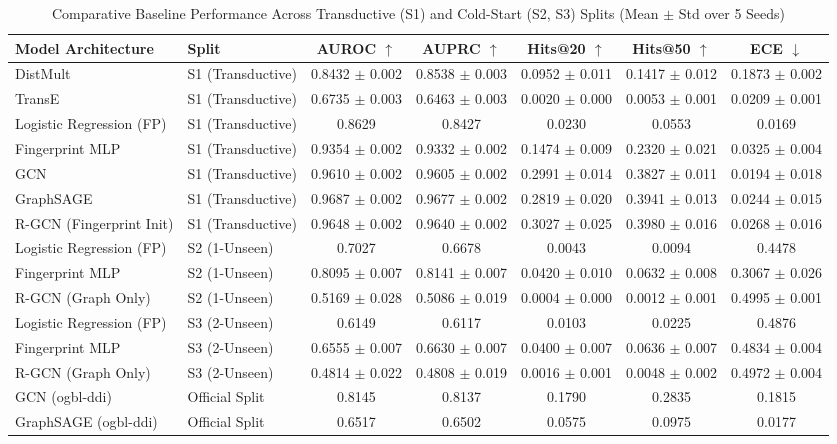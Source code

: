 \begin{table}[t]
\centering
\caption{Comparative Baseline Performance Across Transductive (S1) and Cold-Start (S2, S3) Splits (Mean $\pm$ Std over 5 Seeds)}
\label{tab:baselines}
\begin{tabular}{llccccc}
\toprule
\textbf{Model Architecture} & \textbf{Split} & \textbf{AUROC} $\uparrow$ & \textbf{AUPRC} $\uparrow$ & \textbf{Hits@20} $\uparrow$ & \textbf{Hits@50} $\uparrow$ & \textbf{ECE} $\downarrow$ \\
\midrule
DistMult & S1 (Transductive) & 0.8432 $\pm$ 0.002 & 0.8538 $\pm$ 0.003 & 0.0952 $\pm$ 0.011 & 0.1417 $\pm$ 0.012 & 0.1873 $\pm$ 0.002 \\
TransE & S1 (Transductive) & 0.6735 $\pm$ 0.003 & 0.6463 $\pm$ 0.003 & 0.0020 $\pm$ 0.000 & 0.0053 $\pm$ 0.001 & 0.0209 $\pm$ 0.001 \\
Logistic Regression (FP) & S1 (Transductive) & 0.8629 & 0.8427 & 0.0230 & 0.0553 & 0.0169 \\
Fingerprint MLP & S1 (Transductive) & 0.9354 $\pm$ 0.002 & 0.9332 $\pm$ 0.002 & 0.1474 $\pm$ 0.009 & 0.2320 $\pm$ 0.021 & 0.0325 $\pm$ 0.004 \\
GCN & S1 (Transductive) & 0.9610 $\pm$ 0.002 & 0.9605 $\pm$ 0.002 & 0.2991 $\pm$ 0.014 & 0.3827 $\pm$ 0.011 & 0.0194 $\pm$ 0.018 \\
GraphSAGE & S1 (Transductive) & 0.9687 $\pm$ 0.002 & 0.9677 $\pm$ 0.002 & 0.2819 $\pm$ 0.020 & 0.3941 $\pm$ 0.013 & 0.0244 $\pm$ 0.015 \\
R-GCN (Fingerprint Init) & S1 (Transductive) & 0.9648 $\pm$ 0.002 & 0.9640 $\pm$ 0.002 & 0.3027 $\pm$ 0.025 & 0.3980 $\pm$ 0.016 & 0.0268 $\pm$ 0.016 \\
\midrule
Logistic Regression (FP) & S2 (1-Unseen) & 0.7027 & 0.6678 & 0.0043 & 0.0094 & 0.4478 \\
Fingerprint MLP & S2 (1-Unseen) & 0.8095 $\pm$ 0.007 & 0.8141 $\pm$ 0.007 & 0.0420 $\pm$ 0.010 & 0.0632 $\pm$ 0.008 & 0.3067 $\pm$ 0.026 \\
R-GCN (Graph Only) & S2 (1-Unseen) & 0.5169 $\pm$ 0.028 & 0.5086 $\pm$ 0.019 & 0.0004 $\pm$ 0.000 & 0.0012 $\pm$ 0.001 & 0.4995 $\pm$ 0.001 \\
\midrule
Logistic Regression (FP) & S3 (2-Unseen) & 0.6149 & 0.6117 & 0.0103 & 0.0225 & 0.4876 \\
Fingerprint MLP & S3 (2-Unseen) & 0.6555 $\pm$ 0.007 & 0.6630 $\pm$ 0.007 & 0.0400 $\pm$ 0.007 & 0.0636 $\pm$ 0.007 & 0.4834 $\pm$ 0.004 \\
R-GCN (Graph Only) & S3 (2-Unseen) & 0.4814 $\pm$ 0.022 & 0.4808 $\pm$ 0.019 & 0.0016 $\pm$ 0.001 & 0.0048 $\pm$ 0.002 & 0.4972 $\pm$ 0.004 \\
\midrule
GCN (ogbl-ddi) & Official Split & 0.8145 & 0.8137 & 0.1790 & 0.2835 & 0.1815 \\
GraphSAGE (ogbl-ddi) & Official Split & 0.6517 & 0.6502 & 0.0575 & 0.0975 & 0.0177 \\
\bottomrule
\end{tabular}
\end{table}
